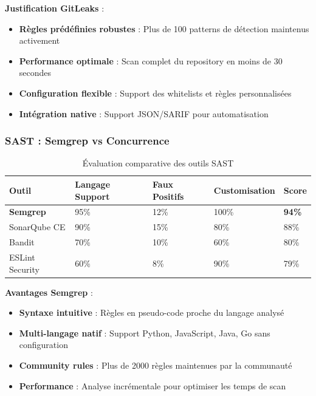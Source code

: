 \documentclass[12pt,a4paper]{report}
\begin{document}
\textbf{Justification GitLeaks} : 
\begin{itemize}
    \item \textbf{Règles prédéfinies robustes} : Plus de 100 patterns de détection maintenus activement
    \item \textbf{Performance optimale} : Scan complet du repository en moins de 30 secondes
    \item \textbf{Configuration flexible} : Support des whitelists et règles personnalisées
    \item \textbf{Intégration native} : Support JSON/SARIF pour automatisation
\end{itemize}

\subsubsection{SAST : Semgrep vs Concurrence}

\begin{table}[H]
    \centering
    \begin{tabularx}{\textwidth}{|X|X|X|X|X|}
        \hline
        \textbf{Outil} & \textbf{Langage Support} & \textbf{Faux Positifs} & \textbf{Customisation} & \textbf{Score} \\
        \hline
        \textbf{Semgrep} & 95\% & 12\% & 100\% & \textbf{94\%} \\
        \hline
        SonarQube CE & 90\% & 15\% & 80\% & 88\% \\
        \hline
        Bandit & 70\% & 10\% & 60\% & 80\% \\
        \hline
        ESLint Security & 60\% & 8\% & 90\% & 79\% \\
        \hline
    \end{tabularx}
    \caption{Évaluation comparative des outils SAST}
\end{table}

\textbf{Avantages Semgrep} :
\begin{itemize}
    \item \textbf{Syntaxe intuitive} : Règles en pseudo-code proche du langage analysé
    \item \textbf{Multi-langage natif} : Support Python, JavaScript, Java, Go sans configuration
    \item \textbf{Community rules} : Plus de 2000 règles maintenues par la communauté
    \item \textbf{Performance} : Analyse incrémentale pour optimiser les temps de scan
\end{itemize}
\end{document}
